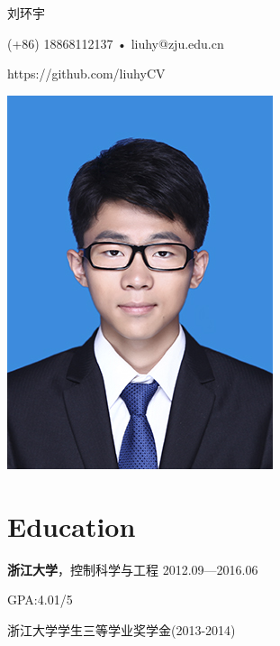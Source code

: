 \documentclass{article}
\begin{document}
 


\pagestyle{empty}  %
\thispagestyle{empty} %


\begin{minipage}[b]{0.6 \linewidth}
\LARGE \centerline{刘环宇}
\linespread{1.5}\selectfont %
\large \centerline{(+86) 18868112137 • liuhy@zju.edu.cn}
\large \centerline{https://github.com/liuhyCV}
\large \centerline{}
\large \centerline{}

\end{minipage}
\hfill
\begin{minipage}[b]{0.25 \linewidth}
\includegraphics[width=7 \baselineskip]{photo.jpg}
\end{minipage}






\section*{Education}
\vspace{-1.3\baselineskip}
\noindent\hrulefill

\par \large \textbf{浙江大学}，控制科学与工程  \hfill 2012.09—2016.06
\linespread{1.2}\selectfont
\par GPA:4.01/5
\par 浙江大学学生三等学业奖学金(2013-2014)
\end{document}
